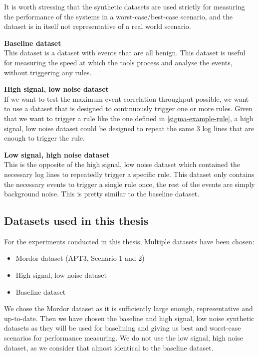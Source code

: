 It is worth stressing that the synthetic datasets are used strictly for measuring the performance of the systems in a worst-case/best-case scenario, and the dataset is in itself not representative of a real world scenario.

\textbf{Baseline dataset}\\
This dataset is a dataset with events that are all benign. This dataset is useful for measuring the speed at which the tools process and analyse the events, without triggering any rules.

\textbf{High signal, low noise dataset}\\
If we want to test the maximum event correlation throughput possible, we want to use a dataset that is designed to continuously trigger one or more rules. Given that we want to trigger a rule like the one defined in \cref{sigma-example-rule}, a high signal, low noise dataset could be designed to repeat the same 3 log lines that are enough to trigger the rule. 

\textbf{Low signal, high noise dataset}\\
This is the opposite of the high signal, low noise dataset which contained the necessary log lines to repeatedly trigger a specific rule. This dataset only contains the necessary events to trigger a single rule once, the rest of the events are simply background noise. This is pretty similar to the baseline dataset.


\subsection{Datasets used in this thesis}
\label{sec:datasets-used}

For the experiments conducted in this thesis, Multiple datasets have been chosen:

\begin{itemize}
    \item Mordor dataset (APT3, Scenario 1 and 2)
    \item High signal, low noise dataset
    \item Baseline dataset
\end{itemize}
We chose the Mordor dataset as it is sufficiently large enough, representative and up-to-date. Then we have chosen the baseline and high signal, low noise synthetic datasets as they will be used for baselining and giving us best and worst-case scenarios for performance measuring. We do not use the low signal, high noise dataset, as we consider that almost identical to the baseline dataset.

